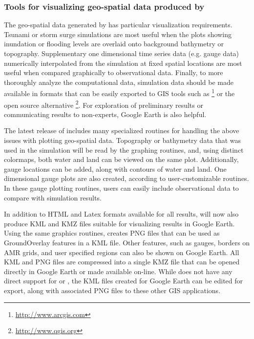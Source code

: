 \subsubsection{Tools for visualizing geo-spatial data produced by \geoclaw}
The geo-spatial data generated by \geoclaw has particular visualization
requirements.  Tsunami or storm surge simulations are most useful when
the plots showing inundation or flooding levels are overlaid onto
background bathymetry or topography.  Supplementary one dimensional
time series data (e.g. gauge data) numerically interpolated from
the simulation at fixed spatial locations are most useful when
compared graphically to observational data.  Finally, to more
thoroughly analyze the computational data, simulation data
should be made available in formats that can be easily exported to GIS tools
such as \agis\footnote{\url{http://www.arcgis.com}}
or the open source alternative \qgis\footnote{\url{http://www.qgis.org}}.
For exploration of preliminary results or
communicating results to non-experts, Google
Earth is also helpful.

The latest release of \clawpack includes many specialized \visclaw routines
for handling the above issues with plotting geo-spatial data.
Topography or bathymetry data that was
used in the simulation will be read by the graphing routines, and,
using distinct colormaps, both water and land can be viewed on the
same plot.   Additionally, gauge locations can be added, along with contours
of water and land.  One dimensional gauge plots are also created, according to
user-customizable routines. In these gauge plotting routines,
users can easily include  observational data to compare with \geoclaw
simulation results.

In addition to HTML and Latex formats available for all \clawpack results,
\visclaw will now also
produce KML and KMZ files suitable for visualizing results in Google Earth.
Using the same \mplotlib graphics routines, \visclaw creates PNG files
that can be used as GroundOverlay features in a KML file.  Other features, such
as gauges, borders on AMR grids, and user specified regions can also be
shown on Google Earth.  All KML and PNG files are compressed into a single
KMZ file  that can be opened directly in Google Earth or made available on-line.
While \visclaw does not have any direct support for \agis or \qgis,
the  KML files created for Google Earth can be edited for
export, along with associated PNG files to these other GIS applications.

